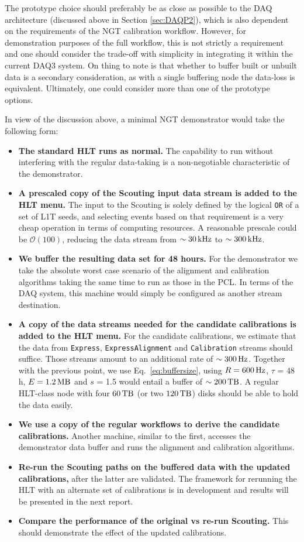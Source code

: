 The prototype choice should preferably be as close as possible to the \Phasetwo DAQ architecture (discussed above in Section \ref{sec:DAQP2}), which is also dependent on the requirements of the NGT calibration workflow. However, for demonstration purposes of the full workflow, this is not strictly a requirement and one should consider the trade-off with simplicity in integrating it within the current DAQ3 system. On thing to note is that whether to buffer built or unbuilt data is a secondary consideration, as with a single buffering node the data-loss is equivalent. Ultimately, one could consider more than one of the prototype options.

In view of the discussion above, a minimal NGT demonstrator would take the following form:
\begin{itemize}
\item \textbf{The standard HLT runs as normal.} 
The capability to run without interfering with the regular data-taking is
a non-negotiable characteristic of the demonstrator.
\item \textbf{A prescaled copy of the Scouting input data stream is added to the HLT menu.}
The input to the Scouting is solely defined by the logical \texttt{OR} of a set of L1T seeds, and
selecting events based on that requirement is a very cheap operation in terms of computing resources.
A reasonable prescale could be $\mathcal{O}(100)$, reducing the data stream 
from $\sim 30\,\text{kHz}$
to $\sim 300\,\text{kHz}$.
\item \textbf{We buffer the resulting data set for 48 hours.}
For the demonstrator we take the absolute worst case scenario of the alignment and calibration algorithms taking the same time to run as those in the PCL.
In terms of the \Runthree DAQ system, this machine would simply be configured as another stream destination.
\item \textbf{A copy of the data streams needed for the candidate calibrations is added to the HLT menu.}
For the candidate calibrations, we estimate that 
the data from \texttt{Express}, \texttt{ExpressAlignment} and \texttt{Calibration} streams should suffice.
Those streams amount to an additional rate of $\sim 300\,\text{Hz}$.
Together with the previous point, we
use Eq.~\ref{eq:buffersize}, using 
$R = 600\,\text{Hz}$,
$\tau$ = 48 h,
$E = 1.2\,\text{MB}$ and
$s$ = 1.5
would entail a buffer of $\sim 200\,\text{TB}$.
A regular HLT-class node with four $60\,\text{TB}$ (or two $120\,\text{TB}$) disks should be able to hold the data easily.
\item \textbf{We use a copy of the regular workflows to derive the candidate calibrations.}
Another machine, similar to the first, accesses the demonstrator data buffer
and
runs the alignment and calibration algorithms.
\item \textbf{Re-run the Scouting paths on the buffered data with the updated calibrations,}
after the latter are validated.
The framework for rerunning the HLT with an alternate set of calibrations is in development and results will be presented in the next report.
\item \textbf{Compare the performance of the original vs re-run Scouting.}
This should demonstrate the effect of the updated calibrations. 
\end{itemize}